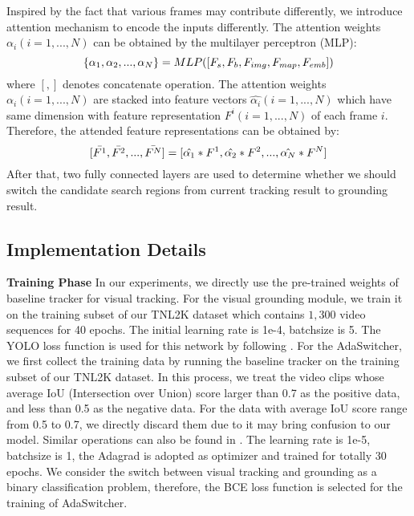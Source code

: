 \documentclass[final]{cvpr}
\begin{document}
Inspired by the fact that various frames may contribute differently, we introduce attention mechanism to encode the inputs differently. The attention weights $\alpha_i (i=1, ... , N)$ can be obtained by the multilayer perceptron (MLP): 
\begin{equation}
\small 
\label{frameAttWeights} 
\{\alpha_1, \alpha_2, ... , \alpha_N\} = MLP([F_s, F_b, F_{img}, F_{map}, F_{emb}])
\end{equation}
where $[ , ]$ denotes concatenate operation. The attention weights $\alpha_i (i=1, ... , N)$ are stacked into feature vectors $\hat{\alpha_i} (i=1, ... , N)$ which have same dimension with feature representation $F^i (i=1, ... , N)$ of each frame $i$. Therefore, the attended feature representations can be obtained by:  
\begin{equation}
\small 
\label{frameAttention} 
[ \bar{F^1}, \bar{F^2}, ... , \bar{F^N} ] = [ \hat{\alpha_1} * F^1,  \hat{\alpha_2}*F^2, ... , \hat{\alpha_N} * F^N] 
\end{equation}
After that, two fully connected layers are used to determine whether we should switch the candidate search regions from current tracking result to grounding result.  



\subsection{Implementation Details} 
\textbf{Training Phase} 
In our experiments, we directly use the pre-trained weights of baseline tracker for visual tracking. For the visual grounding module, we train it on the training subset of our TNL2K dataset which contains $1,300$ video sequences  for 40 epochs. The initial learning rate is 1e-4, batchsize is 5. The YOLO loss function is used for this network by following \cite{redmon2018yolov3, yang2019fastgrounding}. For the AdaSwitcher, we first collect the training data by running the baseline tracker on the training subset of our TNL2K dataset. In this process, we treat the video clips whose average IoU (Intersection over Union) score larger than 0.7 as the positive data, and less than 0.5 as the negative data. For the data with average IoU score range from 0.5 to 0.7, we directly discard them due to it may bring confusion to our model. Similar operations can also be found in \cite{Jung_2018_ECCV}. The learning rate is 1e-5, batchsize is 1, the Adagrad \cite{duchi2011adagrad} is adopted as optimizer and trained for totally 30 epochs. We consider the switch between visual tracking and grounding as a binary classification problem, therefore, the BCE loss function is selected for the training of AdaSwitcher. 
\end{document}
